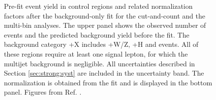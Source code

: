 \begin{figure}[htbp]
	\centering
	\caption{Pre-fit event yield in control regions and related \ttbar
          normalization factors after the background-only fit for
		the cut-and-count and  the multi-bin analyses. The upper panel shows 
		the observed number of events and the predicted background yield before the fit.
		The background category \ttbar+X includes \ttbar+W/Z, \ttbar+H and \ttbar\ttbar events. All of these
                regions require at least one signal lepton, for which the
                multijet background is negligible. All uncertainties described in Section \ref{sec:strong:syst} are included in the uncertainty band.
		The \ttbar normalization is obtained from the fit
                and is displayed in the bottom panel.  Figures from Ref. \cite{Aaboud:2017hrg}.
	} 
	\label{fig:pullCR}
\end{figure}


